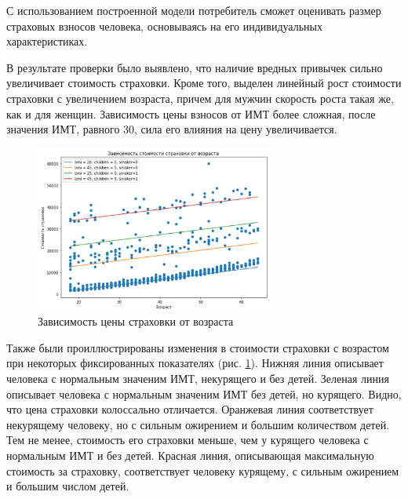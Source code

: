 \documentclass[a4paper,12pt]{article}
\begin{document}
С использованием построенной модели потребитель сможет оценивать размер страховых взносов человека, основываясь на его индивидуальных характеристиках. 

В результате проверки было выявлено, что наличие вредных привычек сильно увеличивает стоимость страховки. Кроме того, выделен линейный рост стоимости страховки с увеличением возраста, причем для мужчин скорость роста такая же, как и для женщин. Зависимость цены взносов от ИМТ более сложная, после значения ИМТ, равного 30, сила его влияния на цену увеличивается.

\begin{figure}[H]
	\includegraphics[width=0.7\textwidth]{../[graphics]/example.jpg}
	\centering
	\caption{Зависимость цены страховки от возраста}
	\label{fig:example}
\end{figure}

Также были проиллюстрированы изменения в стоимости страховки с возрастом при некоторых фиксированных показателях (рис. \ref{fig:example}). Нижняя линия описывает человека с нормальным значеним ИМТ, некурящего и без детей. Зеленая линия описывает человека с нормальным значеним ИМТ без детей, но курящего. Видно, что цена страховки колоссально отличается. Оранжевая линия соответствует некурящему человеку, но с сильным ожирением и большим количеством детей. Тем не менее, стоимость его страховки меньше, чем у курящего человека с нормальным ИМТ и без детей. Красная линия, описывающая максимальную стоимость за страховку, соответствует человеку курящему, с сильным ожирением и большим числом детей.
\end{document}
